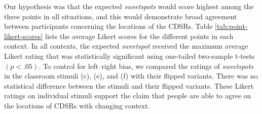 \documentclass[11pt,letterpaper]{article}
\begin{document}






Our hypothesis was that the expected \textit{sweetspots} would score highest among the three points in all situations, and this would demonstrate broad agreement between participants concerning the locations of the CDSRs.  Table \ref{tab:point-likert-scores} lists the average Likert scores for the different points in each context. In all contexts, the expected \textit{sweetspot} received the maximum average Likert rating that was statistically significant using one-tailed two-sample t-tests $(p<.05)$.  To control for left--right bias, we compared the ratings of \textit{sweetspots} in the classroom stimuli (c), (e), and (f) with their flipped variants.  There was no statistical difference between the stimuli and their flipped variants.  These Likert ratings on individual stimuli support the claim that people are able to agree on the locations of CDSRs with changing context.  

\end{document}

